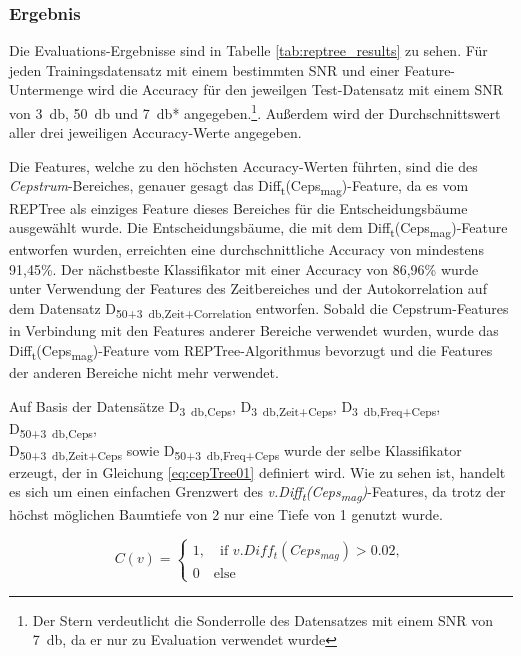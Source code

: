 \subsubsection{Ergebnis} 
\label{sec:vad_result}

Die Evaluations-Ergebnisse  sind in Tabelle \ref{tab:reptree_results} zu sehen. Für jeden Trainingsdatensatz mit einem bestimmten SNR und einer Feature-Untermenge wird die Accuracy für den jeweilgen Test-Datensatz mit einem SNR von \SI{3}{\decibel}, \SI{50}{\decibel} und \SI{7}{\decibel}* angegeben.\footnote{Der Stern verdeutlicht die Sonderrolle des  Datensatzes mit einem SNR von \SI{7}{\decibel}, da er nur zu Evaluation verwendet wurde}. Außerdem wird der Durchschnittswert aller drei jeweiligen Accuracy-Werte angegeben.

Die Features, welche zu den höchsten Accuracy-Werten führten, sind die des \emph{Cepstrum}-Bereiches, genauer gesagt das Diff\textsubscript{t}(Ceps\textsubscript{mag})-Feature, da es vom REPTree als einziges Feature dieses Bereiches für die Entscheidungsbäume ausgewählt wurde. Die Entscheidungsbäume, die mit dem Diff\textsubscript{t}(Ceps\textsubscript{mag})-Feature entworfen wurden, erreichten eine durchschnittliche Accuracy von mindestens 91,45\%. Der nächstbeste Klassifikator mit einer Accuracy von 86,96\% wurde unter Verwendung der Features des Zeitbereiches und der Autokorrelation auf dem Datensatz D\textsubscript{50+\SI{3}{\decibel},Zeit+Correlation} entworfen. Sobald die Cepstrum-Features in Verbindung mit den Features anderer Bereiche verwendet wurden, wurde das Diff\textsubscript{t}(Ceps\textsubscript{mag})-Feature vom REPTree-Algorithmus bevorzugt und die Features der anderen Bereiche nicht mehr verwendet.

Auf Basis der Datensätze D\textsubscript{\SI{3}{\decibel},Ceps}, D\textsubscript{\SI{3}{\decibel},Zeit+Ceps}, D\textsubscript{\SI{3}{\decibel},Freq+Ceps}, D\textsubscript{50+\SI{3}{\decibel},Ceps}, \\ D\textsubscript{50+\SI{3}{\decibel},Zeit+Ceps} sowie D\textsubscript{50+\SI{3}{\decibel},Freq+Ceps} wurde der selbe Klassifikator erzeugt, der in Gleichung \ref{eq:cepTree01} definiert wird. Wie zu sehen ist, handelt es sich um einen einfachen Grenzwert des \emph{v.Diff\textsubscript{t}(Ceps\textsubscript{mag})}-Features, da trotz der höchst möglichen Baumtiefe von 2 nur eine Tiefe von 1 genutzt wurde.

\begin{equation}
C(v) = \begin{cases}
1, \quad \text{if } v.Diff_t(Ceps_{mag}) > 0.02, \\
0 \quad \text{else}
\end{cases}
\label{eq:cepTree01}
\end{equation}


